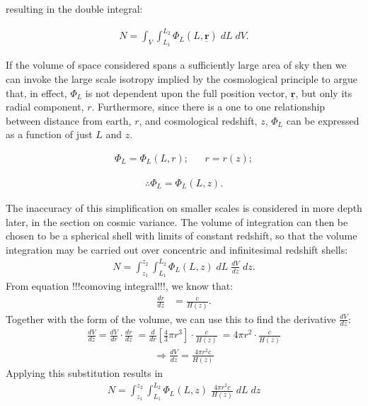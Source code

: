 \documentclass[pdf,color]{UoBnote}
\begin{document}
resulting in the double integral:

\begin{align}	
			N = \int_V { \int_{L_1}^{L_2}   { \Phi_L(L,\underline{\mathbf{r}})  \; dL } \; dV } .	
\end{align}

If the volume of space considered spans a sufficiently large area of sky then we can invoke the large scale isotropy implied by the cosmological principle to argue that, in effect, $\Phi_L$ is not dependent upon the full position vector, $\underline{\mathbf{r}}$, but only its radial component, $r$. Furthermore, since there is a one to one relationship between distance from earth, $r$, and cosmological redshift, $z$, $\Phi_L$ can be expressed as a function of just $L$ and $z$.

\begin{align}	
			\Phi_L = \Phi_L(L,r);	&&	 r= r(z); 		
\end{align}

\begin{align}
			\therefore	\Phi_L = \Phi_L(L,z).	
\end{align}

The inaccuracy of this simplification on smaller scales is considered in more depth later, in the section on cosmic variance.
The volume of integration can then be chosen to be a spherical shell with limits of constant redshift, so that the volume integration may be carried out over concentric and infinitesimal redshift shells:
\begin{align}
			N = \int_{z_1}^{z_2}  { \int_{L_1}^{L_2} { \Phi_L(L,z) \; dL } \;  \frac{dV}{dz} \; dz }.
\end{align}
From equation !!!comoving integral!!!, we know that:
\begin{align} 
		 	\frac{dr}{dz} &= \frac{c}{H(z)}. 
\end{align}
Together with the form of the volume, we can use this to find the derivative $\frac{dV}{dz}$:
\begin{align}	
					\frac{dV}{dz}  	= \frac{dV}{dr} \cdot \frac{dr}{dz} \;  
 				= \frac{d}{dr} \left[\frac{4}{3} \pi r^3 \right ] \cdot \frac{c}{H(z)} \
				= 4 \pi r^2 \cdot \frac{c}{H(z)} 
\end{align}	
\begin{align}	
			\Rightarrow	\frac{dV}{dz}	= \frac{4 \pi r^2 c}{H(z)}			
\end{align}
Applying this substitution results in 
\begin{align}
			N = \int_{z_1}^{z_2}  { \int_{L_1}^{L_2} { \Phi_L(L,z)  \;  \frac{4 \pi r^2 c}{H(z)} \;  dL \; dz } }
\end{align}
\end{document}
